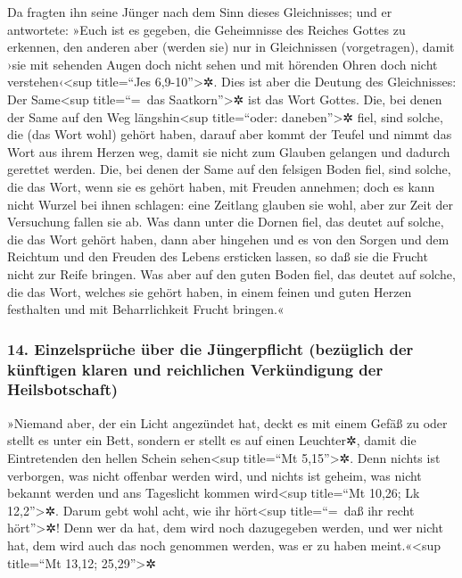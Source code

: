  Da fragten ihn seine Jünger nach dem Sinn dieses
Gleichnisses;  und er antwortete: »Euch ist es gegeben,
die Geheimnisse des Reiches Gottes zu erkennen, den anderen aber (werden
sie) nur in Gleichnissen (vorgetragen), damit ›sie mit sehenden Augen
doch nicht sehen und mit hörenden Ohren doch nicht
verstehen‹\textless sup title=``Jes 6,9-10''\textgreater✲.
 Dies ist aber die Deutung des Gleichnisses: Der
Same\textless sup title=``=~das Saatkorn''\textgreater✲ ist das Wort
Gottes.  Die, bei denen der Same auf den Weg
längshin\textless sup title=``oder: daneben''\textgreater✲ fiel, sind
solche, die (das Wort wohl) gehört haben, darauf aber kommt der Teufel
und nimmt das Wort aus ihrem Herzen weg, damit sie nicht zum Glauben
gelangen und dadurch gerettet werden.  Die, bei denen der
Same auf den felsigen Boden fiel, sind solche, die das Wort, wenn sie es
gehört haben, mit Freuden annehmen; doch es kann nicht Wurzel bei ihnen
schlagen: eine Zeitlang glauben sie wohl, aber zur Zeit der Versuchung
fallen sie ab.  Was dann unter die Dornen fiel, das
deutet auf solche, die das Wort gehört haben, dann aber hingehen und es
von den Sorgen und dem Reichtum und den Freuden des Lebens ersticken
lassen, so daß sie die Frucht nicht zur Reife bringen. 
Was aber auf den guten Boden fiel, das deutet auf solche, die das Wort,
welches sie gehört haben, in einem feinen und guten Herzen festhalten
und mit Beharrlichkeit Frucht bringen.«

\hypertarget{einzelspruxfcche-uxfcber-die-juxfcngerpflicht-bezuxfcglich-der-kuxfcnftigen-klaren-und-reichlichen-verkuxfcndigung-der-heilsbotschaft}{%
\subsubsection{14. Einzelsprüche über die Jüngerpflicht (bezüglich der
künftigen klaren und reichlichen Verkündigung der
Heilsbotschaft)}\label{einzelspruxfcche-uxfcber-die-juxfcngerpflicht-bezuxfcglich-der-kuxfcnftigen-klaren-und-reichlichen-verkuxfcndigung-der-heilsbotschaft}}

 »Niemand aber, der ein Licht angezündet hat, deckt es
mit einem Gefäß zu oder stellt es unter ein Bett, sondern er stellt es
auf einen Leuchter✲, damit die Eintretenden den hellen Schein
sehen\textless sup title=``Mt 5,15''\textgreater✲.  Denn
nichts ist verborgen, was nicht offenbar werden wird, und nichts ist
geheim, was nicht bekannt werden und ans Tageslicht kommen
wird\textless sup title=``Mt 10,26; Lk 12,2''\textgreater✲.
 Darum gebt wohl acht, wie ihr hört\textless sup
title=``=~daß ihr recht hört''\textgreater✲! Denn wer da hat, dem wird
noch dazugegeben werden, und wer nicht hat, dem wird auch das noch
genommen werden, was er zu haben meint.«\textless sup title=``Mt 13,12;
25,29''\textgreater✲


